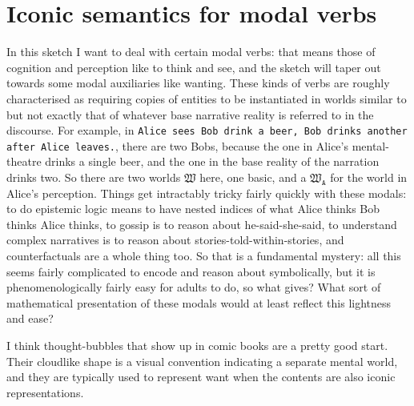\section{Iconic semantics for modal verbs}

In this sketch I want to deal with certain modal verbs: that means those of cognition and perception like to think and see, and the sketch will taper out towards some modal auxiliaries like wanting. These kinds of verbs are roughly characterised as requiring copies of entities to be instantiated in worlds similar to but not exactly that of whatever base narrative reality is referred to in the discourse. For example, in \texttt{Alice sees Bob drink a beer, Bob drinks another after Alice leaves.}, there are two Bobs, because the one in Alice's mental-theatre drinks a single beer, and the one in the base reality of the narration drinks two. So there are two worlds $\mathfrak{W}$ here, one basic, and a $\mathfrak{W}_{\texttt{A}}$ for the world in Alice's perception. Things get intractably tricky fairly quickly with these modals: to do epistemic logic means to have nested indices of what Alice thinks Bob thinks Alice thinks, to gossip is to reason about he-said-she-said, to understand complex narratives is to reason about stories-told-within-stories, and counterfactuals are a whole thing too. So that is a fundamental mystery: all this seems fairly complicated to encode and reason about symbolically, but it is phenomenologically fairly easy for adults to do, so what gives? What sort of mathematical presentation of these modals would at least reflect this lightness and ease?

I think thought-bubbles that show up in comic books are a pretty good start. Their cloudlike shape is a visual convention indicating a separate mental world, and they are typically used to represent want when the contents are also iconic representations.

